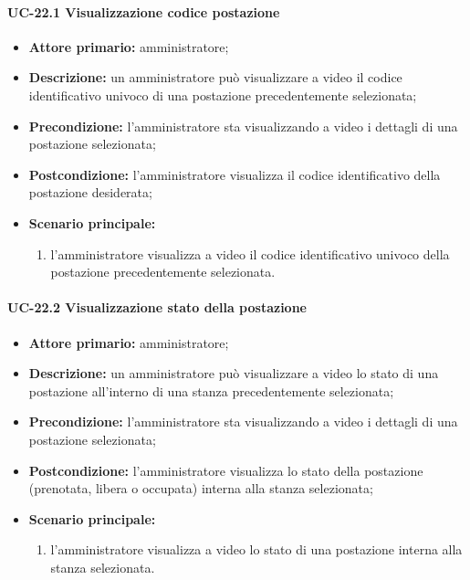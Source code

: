 \paragraph{UC-22.1 Visualizzazione codice postazione}
\begin{itemize}
    \item \textbf{Attore primario:} amministratore;
    \item \textbf{Descrizione:} un amministratore pu\`{o} visualizzare a video il codice identificativo univoco di una postazione precedentemente selezionata;
    \item \textbf{Precondizione:} l'amministratore sta visualizzando a video i dettagli di una postazione selezionata;
    \item \textbf{Postcondizione:} l'amministratore visualizza il codice identificativo della postazione desiderata;
    \item \textbf{Scenario principale:}
    \begin{enumerate}
        \item l'amministratore visualizza a video il codice identificativo univoco della postazione precedentemente selezionata.
    \end{enumerate}
\end{itemize}

\paragraph{UC-22.2 Visualizzazione stato della postazione}
\begin{itemize}
    \item \textbf{Attore primario:} amministratore;
    \item \textbf{Descrizione:} un amministratore pu\`{o} visualizzare a video lo stato di una postazione all'interno di una stanza precedentemente selezionata;
    \item \textbf{Precondizione:} l'amministratore sta visualizzando a video i dettagli di una postazione selezionata;
    \item \textbf{Postcondizione:} l'amministratore visualizza lo stato della postazione (prenotata, libera o occupata) interna alla stanza selezionata;
    \item \textbf{Scenario principale:}
    \begin{enumerate}
        \item l'amministratore visualizza a video lo stato di una postazione interna alla stanza selezionata.
    \end{enumerate}
\end{itemize}
    


